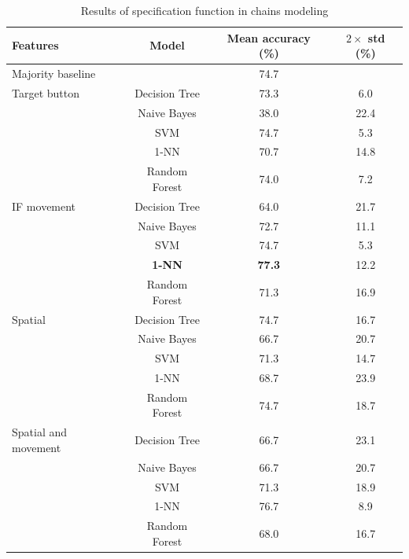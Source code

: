 \begin{table}[!htbp]
 \centering
\begin{tabular}{lccc}
\toprule
Features & Model    & Mean accuracy (\%) & $2\times$ std (\%) \\
\midrule
 Majority baseline &   & 74.7	& \\
\midrule
Target button 	& Decision Tree 	& 73.3		& 6.0 	\\
				& Naive Bayes  	& 38.0		& 22.4	\\
				& SVM 			& 74.7		& 5.3 	\\
				& 1-NN			& 70.7		& 14.8 	\\
				& Random Forest	& 74.0		& 7.2	\\
\midrule
IF movement	& Decision Tree 	& 	64.0	& 21.7 \\
			& Naive Bayes  	&	72.7	& 11.1	\\
			& SVM 			&	74.7	& 5.3 	\\
			& \textbf{1-NN}			&	\textbf{77.3	} & 12.2 	\\
			& Random Forest	&	71.3	& 16.9 	\\
		
\midrule
Spatial	 	& Decision Tree 	& 74.7	& 16.7 \\
			& Naive Bayes  	& 66.7 	& 20.7	\\
			& SVM 			& 71.3	& 14.7 	\\
			& 1-NN			& 68.7	& 23.9 \\
			& Random Forest	& 74.7	& 18.7 \\	
\midrule
Spatial and movement& Decision Tree 	& 66.7	& 23.1 \\
					& Naive Bayes  	& 66.7	& 20.7	\\
					& SVM 			& 71.3	& 18.9 	\\
					& 1-NN			& 76.7	& 8.9 \\
					& Random Forest	& 68.0	& 16.7 \\			
\bottomrule
\end{tabular}
\caption{Results of specification function in chains modeling}
\label{tab:chains-ml-specification}
\end{table}

